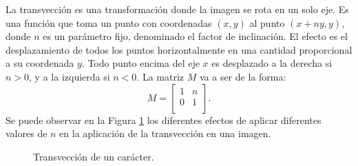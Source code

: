 			La transvección es una transformación donde la imagen se rota en un solo eje. Es una función que toma un punto con coordenadas $(x,y)$ al punto $(x +ny, y)$, donde $n$ es un parámetro fijo, denominado el factor de inclinación. El efecto es el desplazamiento de todos los puntos horizontalmente en una cantidad proporcional a su coordenada $y$. Todo punto encima del eje $x$ es desplazado a la derecha si $n > 0$, y a la izquierda si $n < 0$. La matriz $M$ va a ser de la forma:
			\begin{equation}
				M = 
				\begin{bmatrix}
					1 & n \\
					0 & 1 \\
				\end{bmatrix}.
			\end{equation}
		Se puede observar en la Figura \ref{fig: Transformacion Afin - Transveccion} los diferentes efectos de aplicar diferentes valores de $n$ en la aplicación de la transvección en una imagen.
		\begin{figure}[htbp]
			\centering
			\caption[Transvección de un carácter]{Transvección de un carácter.}
			\label{fig: Transformacion Afin - Transveccion}
		\end{figure}	
		
